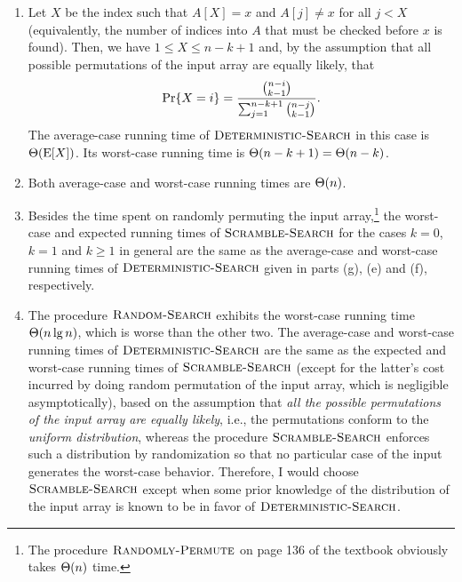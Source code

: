 \begin{enumerate}[\thechapter-1]
\begin{enumerate}[\it a.]
\[
\pr{X = i} = \frac{1}{n}.
\]
Hence,
\[
\ex{X} = \sum^n_{i = 1} i \multp \pr{X = i} = \frac{n + 1}{2}
\]
and the average-case running time of $\proc{Deterministic-Search}$ is $\bigtheta{\ex{X}} = \bigtheta{n}$. Its worst-case running time is $\bigtheta{n}$.
\item Let $X$ be the index such that $A[X] = x$ and $A[j] \neq x$ for all $j < X$ (equivalently, the number of indices into $A$ that must be checked before $x$ is found). Then, we have $1 \leq X \leq n - k + 1$ and, by the assumption that all possible permutations of the input array are equally likely, that
\[
\Pr\!\left\{X = i\right\} = \frac{{n - i \choose k - 1}}{\sum^{n - k + 1}_{j = 1} {n - j \choose k - 1}}.
\]
The average-case running time of $\proc{Deterministic-Search}$ in this case is $\Theta\!\left(\mathrm{E}\!\left[X\right]\right)$. Its worst-case running time is $\Theta\!\left(n - k + 1\right) = \Theta\!\left(n - k\right)$.
\item Both average-case and worst-case running times are $\bigtheta{n}$.
\item Besides the time spent on randomly permuting the input array,\footnote{The procedure $\textnormal{\scshape Randomly-Permute}$ on page 136 of the textbook obviously takes $\bigtheta{n}$ time.} the worst-case and expected running times of $\textnormal{\scshape Scramble-Search}$ for the cases $k = 0$, $k = 1$ and $k \geq 1$ in general are the same as the average-case and worst-case running times of $\proc{Deterministic-Search}$ given in parts (g), (e) and (f), respectively.
\item The procedure $\textnormal{\scshape Random-Search}$ exhibits the worst-case running time $\Theta\!\left(n \lg n\right)$, which is worse than the other two. The average-case and worst-case running times of $\proc{Deterministic-Search}$ are the same as the expected and worst-case running times of $\textnormal{\scshape Scramble-Search}$ (except for the latter's cost incurred by doing random permutation of the input array, which is negligible asymptotically), based on the assumption that \emph{all the possible permutations of the input array are equally likely}, i.e., the permutations conform to the \emph{uniform distribution}, whereas the procedure $\textnormal{\scshape Scramble-Search}$ enforces such a distribution by randomization so that no particular case of the input generates the worst-case behavior. Therefore, I would choose $\textnormal{\scshape Scramble-Search}$ except when some prior knowledge of the distribution of the input array is known to be in favor of $\proc{Deterministic-Search}$.
\end{enumerate}
%
\end{enumerate}
